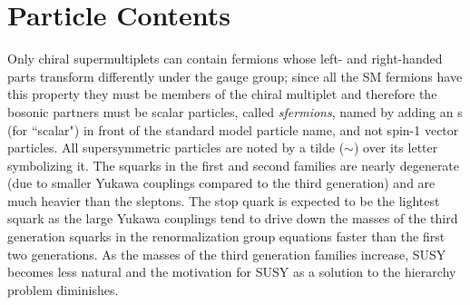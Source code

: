 %
%






\section{Particle Contents}
\label{sec:PartCont}

Only chiral supermultiplets can contain fermions whose left- and right-handed parts transform differently under the gauge group; since all the SM fermions have this property they must be members of the chiral multiplet and therefore the bosonic partners must be scalar particles, called \textit{sfermions}, named by adding an s (for ``scalar") in front of the standard model particle name, and not spin-1 vector particles.  All supersymmetric particles are noted by a tilde ($\sim$) over its letter symbolizing it.  The squarks in the first and second families are nearly degenerate (due to smaller Yukawa couplings compared to the third generation) and are much heavier than the sleptons.  The stop quark is expected to be the lightest squark as the large Yukawa couplings tend to drive down the masses of the third generation squarks in the renormalization group equations faster than the first two generations\cite{susyprimer}.  As the masses of the third generation families increase, SUSY becomes less natural and the motivation for SUSY as a solution to the hierarchy problem diminishes.  \\%

